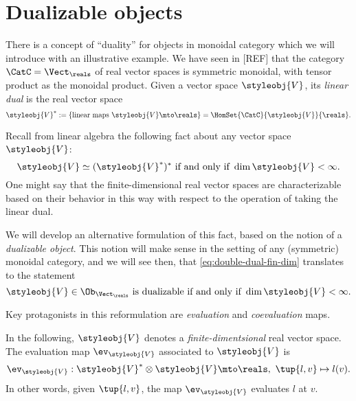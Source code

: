 

\section{Dualizable objects}
\label{sec:dual-objects}

There is a concept of ``duality'' for objects in monoidal category which we will introduce with an illustrative example. We have seen in [REF] that the category $\CatC = \Vect_{\reals}$ of real vector spaces is symmetric monoidal, with tensor product as the monoidal product. Given a vector space $\styleobj{V} $, its \emph{linear dual} is the real vector space
\begin{equation}\label{eq:lin-dual-vecsp}
\styleobj{V} ^{*} := \{ \text{linear maps } \styleobj{V} \mto \reals \} = \HomSet{\CatC}{\styleobj{V}}{ \reals}.
\end{equation}

Recall from linear algebra the following fact about any vector space $\styleobj{V} $: 
\begin{equation}\label{eq:double-dual-fin-dim}
\styleobj{V}  \simeq (\styleobj{V} ^{*})^* \text{ if and only if } \dim \styleobj{V}  < \infty.  
\end{equation}
One might say that the finite-dimensional real vector spaces are characterizable based on their behavior in this way with respect to the operation of taking the linear dual. 

We will develop an alternative formulation of this fact, based on the notion of a \emph{dualizable object}. This notion will make sense in the setting of any (symmetric) monoidal category, and we will see then, that \cref{eq:double-dual-fin-dim} translates to the statement
\begin{equation}\label{eq:dualizable-fin-dim}
\styleobj{V}  \in \Ob_{\Vect_\reals} \text{ is dualizable if and only if } \dim \styleobj{V}  < \infty.  
\end{equation}

Key protagonists in this reformulation are \emph{evaluation} and \emph{coevaluation} maps. 

In the following,  $\styleobj{V} $ denotes a \emph{finite-dimentsional} real vector space. The evaluation map $\ev_\styleobj{V} $ associated to $\styleobj{V} $ is
\begin{equation}\label{eq:evaluation-vecsp}
\ev_\styleobj{V}  : \styleobj{V}^* \otimes \styleobj{V}  \mto \reals, \ \tup{l, v} \mapsto l(v).
\end{equation}
In other words, given $\tup{l, v}$, the map $\ev_\styleobj{V} $ evaluates $l$ at $v$. 


